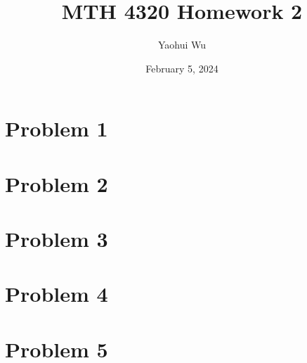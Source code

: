 \documentclass[12pt, letterpaper]{article}
\title{MTH 4320 Homework 2}
\author{Yaohui Wu}
\date{February 5, 2024}
\begin{document}
\maketitle
\tableofcontents
\section{Problem 1}
\section{Problem 2}
\section{Problem 3}
\section{Problem 4}
\section{Problem 5}
\end{document}
